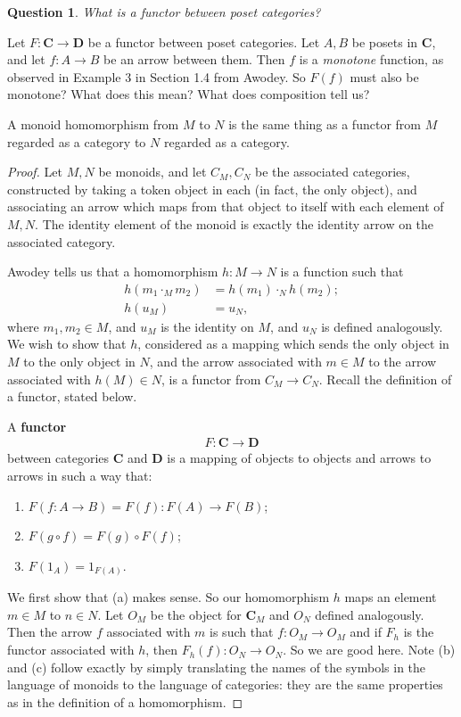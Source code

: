 \documentclass[12pt, reqno]{amsart}
\theoremstyle{definition}
\theoremstyle{definition}
\numberwithin{theorem}{section}
\theoremstyle{plain}
\newtheorem{question}[theorem]{Question}
\theoremstyle{definition}
\theoremstyle{remark}
\newcommand{\bee}{\begin{equation}\begin{aligned}}
\newcommand{\eee}{\end{aligned}\end{equation}}
\newcommand{\vecc}{\mathbf}
\renewcommand{\'}{\hspace{0.5mm}'}			%
\begin{document}
\begin{question}
	What is a functor between poset categories?
\end{question}

Let $F:\vecc{C} \to \vecc{D}$ be a functor 
between poset categories. 
Let $A,B$ be posets in $\vecc{C}$, and let $f:A \to B$ 
be an arrow 
between them. Then $f$ is a \textit{monotone} 
function, as observed
in Example 3 in Section 1.4 from Awodey. 
So $F(f)$ must also be monotone? What does this mean? 
What does composition tell us?

\begin{Claim}
	A monoid homomorphism from $M$ to $N$ is the same thing
	as a functor from $M$ regarded as a category to $N$
	regarded as a category. 
\end{Claim}

\begin{proof}
	Let $M,N$ be monoids, and let $C_M,C_N$ be the associated
	categories, constructed by taking a token object
	in each (in fact, the only object), and associating
	an arrow which maps from that object to itself 
	with each element of $M,N$. The identity element of 
	the monoid is exactly the identity arrow on the
	associated category. 
	
	Awodey tells us that a homomorphism $h:M \to N$ 
	is a function such that
	\bee
		h(m_1 \cdot_M m_2) &= h(m_1)\cdot_N h(m_2) ; \\
		h(u_M) &= u_N,
	\eee
	where $m_1,m_2 \in M$, and $u_M$ is the identity on 
	$M$, and $u_N$ is defined analogously. We wish
	to show that $h$, considered as a mapping which
	sends the only object in $M$ to the only object in $N$, 
	and the arrow associated with $m \in M$ to 
	the arrow associated with $h(M) \in N$, is
	a functor from $C_M \to C_N$. Recall the definition of
	a functor, stated below. 
	\begin{Def}
		A \textbf{functor} 
		\bee
			F:\vecc{C} \to \vecc{D}
		\eee
		between categories $\vecc{C}$ and $\vecc{D}$
		is a mapping of objects to objects and arrows to
		arrows in such a way that:
		\begin{enumerate}[label=(\alph*)]
			\item $F(f:A \to B) = F(f):F(A) \to F(B)$;
			\item $F(g \circ f) = F(g) \circ F(f)$;
			\item $F(1_A) = 1_{F(A)}$. 
		\end{enumerate}
	\end{Def}
	We first show that (a) makes sense. 
	So our homomorphism $h$ maps an element $m \in M$
	to $n \in N$. Let $O_M$ be the object for 
	$\vecc{C}_M$ and $O_N$ defined analogously. Then
	the arrow $f$ associated with $m$
	is such that $f:O_M \to O_M$ and if 
	$F_h$ is the functor associated with $h$, 
	then $F_h(f):O_N \to O_N$. So we are good here. 
	Note (b) and (c) follow exactly by simply 
	translating the names of the symbols in the 
	language of monoids to the language of categories:
	they are the same properties as in the definition
	of a homomorphism. 
\end{proof}
\end{document}
